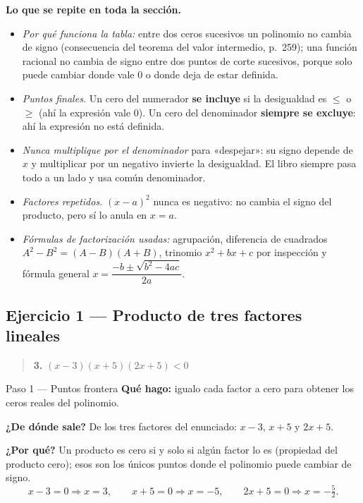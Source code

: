 \documentclass[11pt]{article}
\begin{document}
\begin{tip}
\textbf{Lo que se repite en toda la sección.}
\begin{itemize}[leftmargin=*]
\item \emph{Por qué funciona la tabla:} entre dos ceros sucesivos un polinomio no cambia de signo (consecuencia del teorema del valor intermedio, p.~259); una función racional no cambia de signo entre dos puntos de corte sucesivos, porque solo puede cambiar donde vale $0$ o donde deja de estar definida.
\item \emph{Puntos finales.} Un cero del numerador \textbf{se incluye} si la desigualdad es $\le$ o $\ge$ (ahí la expresión vale $0$). Un cero del denominador \textbf{siempre se excluye}: ahí la expresión no está definida.
\item \emph{Nunca multiplique por el denominador} para «despejar»: su signo depende de $x$ y multiplicar por un negativo invierte la desigualdad. El libro siempre pasa todo a un lado y usa común denominador.
\item \emph{Factores repetidos.} $(x-a)^2$ nunca es negativo: no cambia el signo del producto, pero sí lo anula en $x=a$.
\item \emph{Fórmulas de factorización usadas:} agrupación, diferencia de cuadrados $A^2-B^2=(A-B)(A+B)$, trinomio $x^2+bx+c$ por inspección y fórmula general $x=\dfrac{-b\pm\sqrt{b^2-4ac}}{2a}$.
\end{itemize}
\end{tip}

\subsection*{Ejercicio 1 — Producto de tres factores lineales}

\begin{quote}
\textbf{3.} $(x-3)(x+5)(2x+5)<0$
\end{quote}

\begin{paso}{Paso 1 --- Puntos frontera}
\textbf{Qué hago:} igualo cada factor a cero para obtener los ceros reales del polinomio.

\textbf{¿De dónde sale?} De los tres factores del enunciado: $x-3$, $x+5$ y $2x+5$.

\textbf{¿Por qué?} Un producto es cero si y solo si algún factor lo es (propiedad del producto cero); esos son los únicos puntos donde el polinomio puede cambiar de signo.
\[
x-3=0\Rightarrow x=3,\qquad x+5=0\Rightarrow x=-5,\qquad 2x+5=0\Rightarrow x=-\tfrac{5}{2}.
\]
\end{paso}
\end{document}
